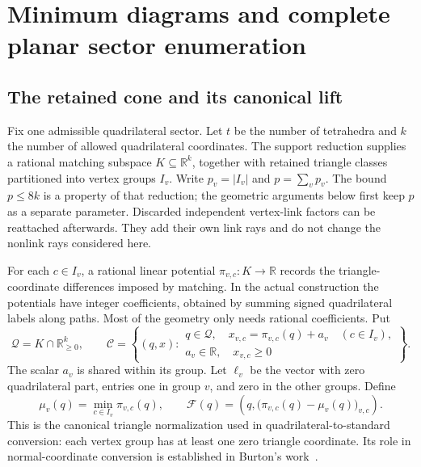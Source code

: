 \providecommand{\R}{\mathbb{R}}
\providecommand{\Q}{\mathbb{Q}}
\providecommand{\N}{\mathbb{N}}
\providecommand{\Ccal}{\mathcal{C}}
\providecommand{\Fcal}{\mathcal{F}}
\providecommand{\Qcal}{\mathcal{Q}}

\section{Minimum diagrams and complete planar sector enumeration}
\label{pl:theory}

\subsection{The retained cone and its canonical lift}
\label{pl:canonical}

Fix one admissible quadrilateral sector.  Let \(t\) be the number of
tetrahedra and \(k\) the number of allowed quadrilateral coordinates.
The support reduction supplies a rational matching subspace
\(K\subseteq\R^k\), together with retained triangle classes partitioned
into vertex groups \(I_v\).  Write \(p_v=|I_v|\) and \(p=\sum_vp_v\).
The bound \(p\leq8k\) is a property of that reduction; the geometric
arguments below first keep \(p\) as a separate parameter.  Discarded
independent vertex-link factors can be reattached afterwards.  They add
their own link rays and do not change the nonlink rays considered here.

For each \(c\in I_v\), a rational linear potential
\(\pi_{v,c}:K\longrightarrow\R\) records the triangle-coordinate
differences imposed by matching.  In the actual construction the
potentials have integer coefficients, obtained by summing signed
quadrilateral labels along paths.  Most of the geometry only needs
rational coefficients.  Put
\[
 \Qcal=K\cap\R_{\geq0}^k,\qquad
 \Ccal=\left\{(q,x):
 \begin{array}{l}
 q\in\Qcal,\quad
 x_{v,c}=\pi_{v,c}(q)+a_v\quad(c\in I_v),\\
 a_v\in\R,\quad x_{v,c}\geq0
 \end{array}\right\}.
\]
The scalar \(a_v\) is shared within its group.  Let \(\ell_v\) be the
vector with zero quadrilateral part, entries one in group \(v\), and
zero in the other groups.  Define
\begin{equation}
 \mu_v(q)=\min_{c\in I_v}\pi_{v,c}(q),\qquad
 \Fcal(q)=
 \left(q,\bigl(\pi_{v,c}(q)-\mu_v(q)\bigr)_{v,c}\right).
 \label{pl:canonical-map}
\end{equation}
This is the canonical triangle normalization used in
quadrilateral-to-standard conversion: each vertex group has at least
one zero triangle coordinate.  Its role in normal-coordinate
conversion is established in Burton's work~\cite{Burton2009}.

